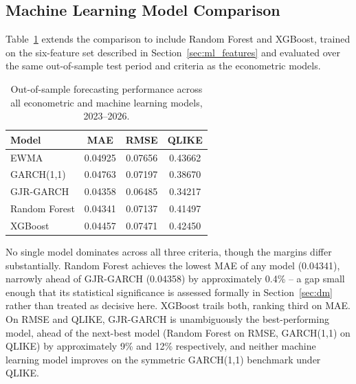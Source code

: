 \documentclass[12pt,a4paper]{article}
\begin{document}
\subsection{Machine Learning Model Comparison}\label{sec:ml_comparison}
Table~\ref{tab:full_comparison} extends the comparison to include Random Forest and XGBoost,
trained on the six-feature set described in Section~\ref{sec:ml_features} and evaluated over the
same out-of-sample test period and criteria as the econometric models.

\begin{table}[H]
\centering
\begin{tabular}{lccc}
\toprule
\textbf{Model} & \textbf{MAE} & \textbf{RMSE} & \textbf{QLIKE} \\
\midrule
EWMA          & 0.04925 & 0.07656 & 0.43662 \\
GARCH(1,1)    & 0.04763 & 0.07197 & 0.38670 \\
GJR-GARCH     & 0.04358 & 0.06485 & 0.34217 \\
Random Forest & 0.04341 & 0.07137 & 0.41497 \\
XGBoost       & 0.04457 & 0.07471 & 0.42450 \\
\bottomrule
\end{tabular}
\caption{Out-of-sample forecasting performance across all econometric and machine learning models, 2023--2026.}
\label{tab:full_comparison}
\end{table}

No single model dominates across all three criteria, though the margins differ substantially.
Random Forest achieves the lowest MAE of any model (0.04341), narrowly ahead of GJR-GARCH (0.04358)
by approximately 0.4\% -- a gap small enough that its statistical significance is assessed formally
in Section~\ref{sec:dm} rather than treated as decisive here. XGBoost trails both, ranking third on
MAE. On RMSE and QLIKE, GJR-GARCH is unambiguously the best-performing model, ahead of the
next-best model (Random Forest on RMSE, GARCH(1,1) on QLIKE) by approximately 9\% and 12\%
respectively, and neither machine learning model improves on the symmetric GARCH(1,1) benchmark
under QLIKE.
\end{document}
